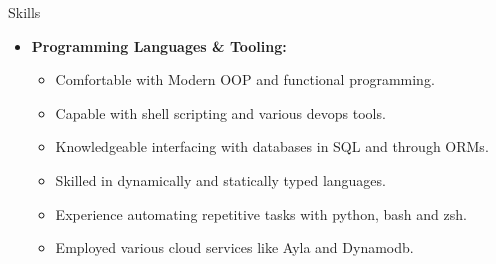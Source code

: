 \documentclass[11pt,oneside]{article}
\newenvironment{ressection}[1]{
	\vspace{4pt}
	{\fontfamily{phv}\selectfont\Large#1}
	\begin{itemize}
	\vspace{3pt}
}{
	\end{itemize}
}
\newcommand{\resitem}[1]{
	\vspace{-4pt}
	\item \begin{flushleft} #1 \end{flushleft}
}
\newcommand{\ressubitem}[1]{
	\vspace{-1pt}
	\item \begin{flushleft} #1 \end{flushleft}
}
\newenvironment{reslist}[1]{
	\resitem{\textbf{#1}}
	\vspace{-5pt}
	\begin{itemize}
}{
	\end{itemize}
}
\begin{document}
\begin{ressection}{Skills}
	\begin{reslist}{Programming Languages \& Tooling:}
		\ressubitem{Comfortable with Modern OOP and functional programming.}
		\ressubitem{Capable with shell scripting and various devops tools.}
		\ressubitem{Knowledgeable interfacing with databases in SQL and through ORMs.}
		\ressubitem{Skilled in dynamically and statically typed languages. }
		\ressubitem{Experience automating repetitive tasks with python, bash and zsh.}
		\ressubitem{Employed various cloud services like Ayla and Dynamodb.}
\end{reslist}
\end{ressection}
\end{document}
